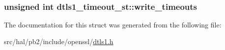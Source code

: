 \subsubsection[{\texorpdfstring{write\+\_\+timeouts}{write_timeouts}}]{\setlength{\rightskip}{0pt plus 5cm}unsigned int dtls1\+\_\+timeout\+\_\+st\+::write\+\_\+timeouts}\hypertarget{structdtls1__timeout__st_af3fb942d16bbbdf73e6151d7e4e6113b}{}\label{structdtls1__timeout__st_af3fb942d16bbbdf73e6151d7e4e6113b}


The documentation for this struct was generated from the following file\+:\begin{DoxyCompactItemize}
\item 
src/hal/pb2/include/openssl/\hyperlink{dtls1_8h}{dtls1.\+h}\end{DoxyCompactItemize}
